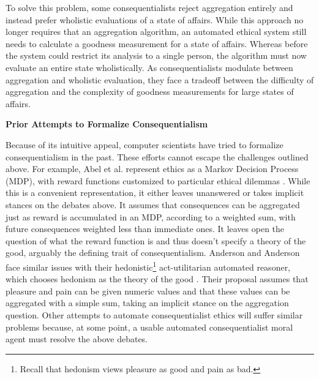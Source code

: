 \begin{isabellebody}
\begin{isamarkuptext}
To solve this problem, some consequentialists reject aggregation entirely and instead prefer wholistic
evaluations of a state of affairs. While this approach no longer requires that an 
aggregation algorithm, an automated ethical system still needs to calculate a goodness measurement for a state of 
affairs. Whereas before the system could restrict its analysis to a single person, the algorithm must now 
evaluate an entire state wholistically. As consequentialists modulate between aggregation 
and wholistic evaluation, they face a tradeoff between the difficulty of aggregation and the complexity 
of goodness measurements for large states of affairs.%
\end{isamarkuptext}\isamarkuptrue%
%
\begin{isamarkuptext}%
\noindent \textbf{Prior Attempts to Formalize Consequentialism}%
\end{isamarkuptext}\isamarkuptrue%
%
\begin{isamarkuptext}%
Because of its intuitive appeal, computer scientists have tried to formalize consequentialism in the past.
These efforts cannot escape the challenges outlined above. For example, Abel et al. represent ethics as a
Markov Decision Process (MDP), with reward functions customized to particular ethical dilemmas 
\citep[3]{util1}. While this is a convenient representation, it either leaves unanswered or 
takes implicit stances on the debates above. It assumes that consequences can be aggregated just as 
reward is accumulated in an MDP, according to a weighted sum, with future consequences weighted less
than immediate ones. It leaves open the question of what the reward function is and thus doesn't 
specify a theory of the good, arguably the defining trait of consequentialism. Anderson and Anderson
face similar issues with their hedonistic\footnote{Recall that hedonism views pleasure as good
and pain as bad.} act-utilitarian automated reasoner, which chooses hedonism as the theory of the good \citep[2]{util2}. 
Their proposal assumes that pleasure and pain can be 
given numeric values and that these values can be aggregated with a simple sum, taking an implicit
stance on the aggregation question. Other attempts to automate consequentialist ethics will suffer 
similar problems because, at some point, a usable automated consequentialist moral agent must
resolve the above debates.%
\end{isamarkuptext}\isamarkuptrue%
%
\isadelimdocument
%
\endisadelimdocument
%
\isatagdocument
%
\isamarkuptrue%

\end{isabellebody}
